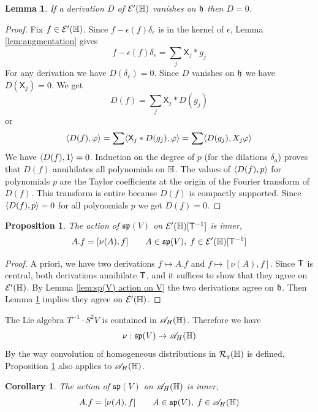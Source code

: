 \documentclass[11pt]{amsart}
\theoremstyle{plain}
\newtheorem{proposition}[theorem]{Proposition}
\newtheorem{lemma}[theorem]{Lemma}
\newtheorem{corollary}[theorem]{Corollary}
\theoremstyle{definition}
\theoremstyle{remark}
\begin{document}
\begin{lemma}\label{lem:vanishing D}
If a derivation $D$ of ${\mathcal{E}}'(\mathbb{H})$ vanishes on $\mathfrak{h}$ then $D=0$.
\end{lemma}
\begin{proof}
Fix $f\in {\mathcal{E}}'(\mathbb{H})$. Since $f-\epsilon(f)\delta_e$ is in the kernel of $\epsilon$, Lemma \ref{lem:augmentation} gives
\[ f - \epsilon(f)\delta_e =\sum_j \mathsf X_j * g_j\]
For any derivation we have $D(\delta_e)=0$. Since $D$ vanishes on $\mathfrak{h}$ we have $D(\mathsf X_j)=0$.
We get
\[ D(f) = \sum_j \mathsf X_j * D(g_j)\]
or
\[ \langle D(f), \varphi \rangle = \sum \langle \mathsf X_j\ast D(g_j), \varphi \rangle= \sum \langle D(g_j), X_j \varphi \rangle\]
We have $\langle D(f), 1 \rangle=0$.
Induction on the degree of $p$ (for the dilations $\delta_a$) proves that $D(f)$ annihilates all polynomials on $\mathbb{H}$.
The values of $\langle D(f),p \rangle$ for polynomials $p$ are the Taylor coefficients at the origin
of the Fourier transform of $D(f)$.
This transform is entire because $D(f)$ is compactly supported.
Since $\langle D(f),p \rangle=0$ for all polynomials $p$ we get $D(f)=0$.
\end{proof}

\begin{proposition}\label{prop:sp(V) action is inner}
The action of $\mathfrak{sp}(V)$ on ${\mathcal{E}}'(\mathbb{H})[\mathsf{T}^{-1}]$ is inner,
\[ A.f=[\nu(A),f]\qquad A\in \mathfrak{sp}(V),\;f\in{\mathcal{E}}'(\mathbb{H})[\mathsf{T}^{-1}]\]
\end{proposition}
\begin{proof}
A priori, we have two derivations $f\mapsto A.f$ and $f\mapsto [\nu(A),f]$.
Since $\mathsf{T}$ is central, both derivations annihilate $\mathsf{T}$, and it suffices to show that they agree on $\mathcal{E}'(\mathbb{H})$.
By Lemma \ref{lem:sp(V) action on V} the two derivations agree on $\mathfrak{h}$.
Then Lemma \ref{lem:vanishing D} implies they agree on $\mathcal{E}'(\mathbb{H})$.
\end{proof}

The Lie algebra $T^{-1}\cdot S^2V$ is contained in ${\mathscr{A}}_H(\mathbb{H})$. Therefore we have
\[ \nu:\mathfrak{sp}(V)\to {\mathscr{A}}_H(\mathbb{H})\]
By the way convolution of homogeneous distributions in $\mathcal{R}_q(\mathbb{H})$ is defined,
Proposition \ref{prop:sp(V) action is inner}
also applies to ${\mathscr{A}}_H(\mathbb{H})$.

\begin{corollary}\label{cor:sp(V) action inner}
The action of $\mathfrak{sp}(V)$ on ${\mathscr{A}}_H(\mathbb{H})$ is inner,
\[ A.f=[\nu(A),f]\qquad A\in \mathfrak{sp}(V),\;f\in{\mathscr{A}}_H(\mathbb{H})\]
\end{corollary}
\end{document}
